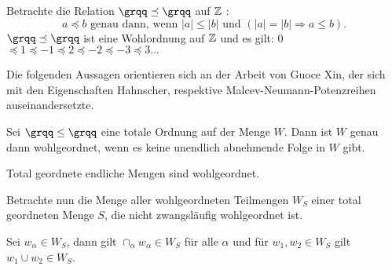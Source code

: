 %
%
\begin{bsp}
Betrachte die Relation $\grqq\preceq \grqq $ auf $\mathbb{Z}$ :  
\[a \preceq b \text{ genau dann, wenn } |a| \leq |b| \text{ und } \left( |a| = |b| \Rightarrow a \leq  b \right).\]
 $\grqq\preceq \grqq $ ist eine Wohlordnung auf $\mathbb{Z}$ und es gilt: 0$  \preceq 1 \preceq -1 \preceq 2 \preceq -2 \preceq -3 \preceq 3 ... $ 
\end{bsp}
Die folgenden Aussagen orientieren sich an der Arbeit \cite{xin04} von Guoce Xin, der sich mit den Eigenschaften Hahnscher, respektive Malcev-Neumann-Potenzreihen auseinandersetzte. 
\begin{satz}\label{wohlgeordnetabnehmendeFolge} 
Sei $\grqq\le\grqq$ eine totale Ordnung auf der Menge $W$. Dann ist $W$ genau dann wohlgeordnet, wenn es keine unendlich abnehmende Folge in $W$ gibt.
\end{satz}
%
\begin{bsp}
Total geordnete endliche Mengen sind wohlgeordnet.
\end{bsp}
Betrachte nun die Menge aller wohlgeordneten Teilmengen $W_S$ einer total geordneten Menge $S$, die nicht zwangsläufig wohlgeordnet ist. 
\begin{lemma}\label{wohlgeordnvereinigung} %
Sei $w_\alpha \in W_S$, dann gilt $\cap_\alpha w_\alpha \in W_S$ für alle $\alpha$ und für $w_1, w_2 \in W_S$ gilt $w_1 \cup w_2 \in W_S$.
\end{lemma}
